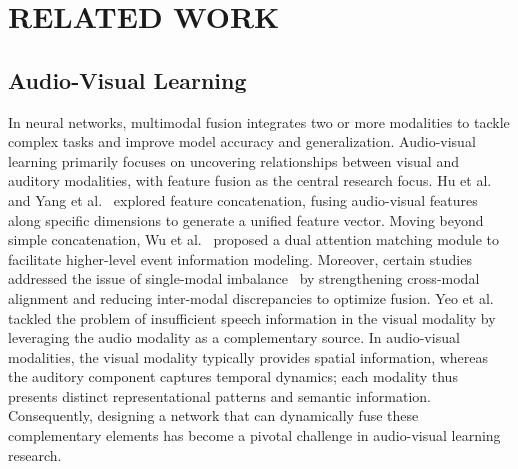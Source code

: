 \section{RELATED WORK}
\subsection{Audio-Visual Learning}
In neural networks, multimodal fusion integrates two or more modalities to tackle complex tasks and improve model accuracy and generalization. Audio-visual learning primarily focuses on uncovering relationships between visual and auditory modalities, with feature fusion as the central research focus. Hu et al.~\cite{hu2016temporal} and Yang et al.~\cite{yang2020telling} explored feature concatenation, fusing audio-visual features along specific dimensions to generate a unified feature vector. Moving beyond simple concatenation, Wu et al.~\cite{wu2019dual} proposed a dual attention matching module to facilitate higher-level event information modeling. Moreover, certain studies addressed the issue of single-modal imbalance~\cite{feichtenhofer2019slowfast, peng2022balanced} by strengthening cross-modal alignment and reducing inter-modal discrepancies to optimize fusion. Yeo et al.~\cite{yeo2024akvsr} tackled the problem of insufficient speech information in the visual modality by leveraging the audio modality as a complementary source. In audio-visual modalities, the visual modality typically provides spatial information, whereas the auditory component captures temporal dynamics; each modality thus presents distinct representational patterns and semantic information. Consequently, designing a network that can dynamically fuse these complementary elements has become a pivotal challenge in audio-visual learning research.

